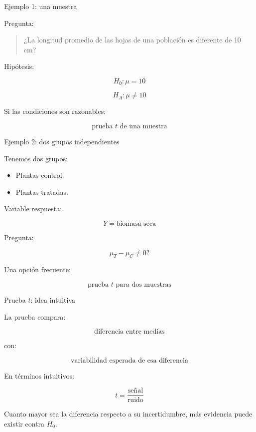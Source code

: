 \documentclass[aspectratio=169,11pt]{beamer}
\begin{document}
\begin{frame}{Ejemplo 1: una muestra}

Pregunta:

\begin{quote}
¿La longitud promedio de las hojas de una población es diferente
de 10 cm?
\end{quote}

Hipótesis:

\[
H_0:\mu=10
\]

\[
H_A:\mu\neq10
\]

Si las condiciones son razonables:

\[
\text{prueba }t\text{ de una muestra}
\]

\end{frame}

\begin{frame}{Ejemplo 2: dos grupos independientes}

Tenemos dos grupos:

\begin{itemize}
    \item Plantas control.
    \item Plantas tratadas.
\end{itemize}

Variable respuesta:

\[
Y=\text{biomasa seca}
\]

Pregunta:

\[
\mu_T-\mu_C\neq0?
\]

Una opción frecuente:

\[
\boxed{\text{prueba }t\text{ para dos muestras}}
\]

\end{frame}

\begin{frame}{Prueba $t$: idea intuitiva}

La prueba compara:

\[
\text{diferencia entre medias}
\]

con:

\[
\text{variabilidad esperada de esa diferencia}
\]

En términos intuitivos:

\[
t=
\frac{\text{señal}}
{\text{ruido}}
\]

\pause

Cuanto mayor sea la diferencia respecto a su incertidumbre,
más evidencia puede existir contra $H_0$.

\end{frame}
\end{document}
